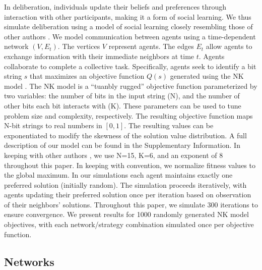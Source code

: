 \documentclass[twocolumn,10pt]{article}
\begin{document}
In deliberation, individuals update their beliefs and preferences through interaction with other participants, making it a form of social learning. We thus simulate deliberation using a model of social learning closely resembling those of other authors \cite{
lazer_network_2007,
mason_propagation_2008,
barkoczi_social_2016,
gomez_clustering_2019}.
We model communication between agents using a time-dependent network $(V,E_t)$. The vertices $V$ represent agents. The edges $E_t$ allow agents to exchange information with their immediate neighbors at time $t$.
Agents collaborate to complete a collective task.
Specifically, agents seek to identify a bit string $s$ that maximizes an objective function $Q(s)$ generated using the NK model \cite{kauffman_towards_1987, weinberger_local_1991}.
The NK model is a ``tuanbly rugged'' objective function parameterized by two variables: the number of bits in the input string (N), and the number of other bits each bit interacts with (K).
These parameters can be used to tune problem size and complexity, respectively. The resulting objective function maps N-bit strings to real numbers in $[0,1]$. The resulting values can be exponentiated to modify the skewness of the solution value distribution. A full description of our model can be found in the Supplementary Information.
In keeping with other authors \cite{lazer_network_2007, barkoczi_social_2016}, we use N=15, K=6, and an exponent of 8 throughout this paper. In keeping with convention, we normalize fitness values to the global maximum.
In our simulations each agent maintains exactly one preferred solution (initially random). The simulation proceeds iteratively, with agents updating their preferred solution once per iteration based on observation of their neighbors' solutions. Throughout this paper, we simulate 300 iterations to ensure convergence. We present results for 1000 randomly generated NK model objectives, with each network/strategy combination simulated once per objective function.

\subsection{Networks}
\end{document}
